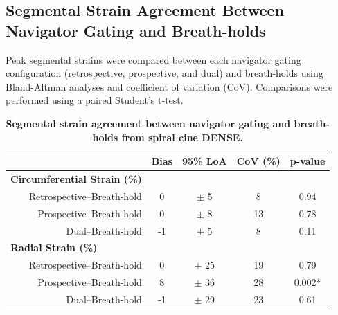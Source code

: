 \begin{appendices}
	\section{Segmental Strain Agreement Between Navigator Gating and Breath-holds}
	Peak segmental strains were compared between each navigator gating configuration (retrospective, prospective, and dual) and breath-holds using Bland-Altman analyses and coefficient of variation (CoV). Comparisons were performed using a paired Student’s t-test.
	
	\begin{table}
		\centering
		\caption[Segmental strain agreement between navigator gating and breath-holds from spiral cine DENSE]{\textbf{Segmental strain agreement between navigator gating and breath-holds from spiral cine DENSE.}}
		\label{table:nav_CI_seg_strains}
		\begin{tabular}{c c c c c}
			\toprule
			\multicolumn{1}{c}{}&\multicolumn{1}{c}{\textbf{Bias}}&\multicolumn{1}{c}{\textbf{95\% LoA}}& \multicolumn{1}{c}{\textbf{CoV (\%)}} & \multicolumn{1}{c}{\textbf{p-value}}\\ \midrule
			\multicolumn{1}{l}{\textbf{Circumferential Strain (\%)}}                       						   & \multicolumn{4}{c}{}     \\
			\multicolumn{1}{r}{Retrospective--Breath-hold}  & \multicolumn{1}{c}{0}  & \multicolumn{1}{c}{$\pm$ 5} & \multicolumn{1}{c}{8}   & \multicolumn{1}{c}{0.94} \\
			\multicolumn{1}{r}{Prospective--Breath-hold}    & \multicolumn{1}{c}{0}  & \multicolumn{1}{c}{$\pm$ 8} & \multicolumn{1}{c}{13}  & \multicolumn{1}{c}{0.78} \\
			\multicolumn{1}{r}{Dual--Breath-hold}           & \multicolumn{1}{c}{-1} & \multicolumn{1}{c}{$\pm$ 5} & \multicolumn{1}{c}{8}   & \multicolumn{1}{c}{0.11} \\
			\multicolumn{1}{l}{\textbf{Radial Strain (\%)}}                       						   & \multicolumn{4}{c}{}     \\
			\multicolumn{1}{r}{Retrospective--Breath-hold}  & \multicolumn{1}{c}{0}  & \multicolumn{1}{c}{$\pm$ 25} & \multicolumn{1}{c}{19}   & \multicolumn{1}{c}{0.79} \\
			\multicolumn{1}{r}{Prospective--Breath-hold}    & \multicolumn{1}{c}{8}  & \multicolumn{1}{c}{$\pm$ 36} & \multicolumn{1}{c}{28}  & \multicolumn{1}{c}{0.002*} \\
			\multicolumn{1}{r}{Dual--Breath-hold}           & \multicolumn{1}{c}{-1} & \multicolumn{1}{c}{$\pm$ 29} & \multicolumn{1}{c}{23}   & \multicolumn{1}{c}{0.61} \\

\end{tabular}
\end{table}
\end{appendices}
